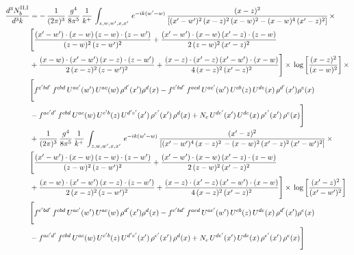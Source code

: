 \documentclass[9pt]{article}
\numberwithin{equation}{section}
\begin{document}
\begin{align}
    \frac{d^{3}N^{\rm II,I}_{b}}{d^{3}k}  & =  -\, \frac{1}{(2\pi)^{3}}\, \frac{g^{4}}{8\pi^{5}}\,\frac{1}{k^{+}}\,\int_{z,w,w^{\prime},x,x'}\, e^{-ik(w^{\prime}-w)}\, \frac{(x-z)^{2}}{\left[(x'-w')^{2}\,(x-z)^{2}\,(x-w)^{2} - (x-w)^{4}\, (x'-z)^{2}\right]}\,  \times\notag \\ & \Bigg[\frac{(x'-w')\cdot (x-w)\, (z-w)\cdot (z-w')}{(z-w)^{2}\, (z-w')^{2}}+\frac{(x'-w')\cdot (x-w)\, (x'-z)\cdot (z-w)}{2\, (z-w)^{2}\, (x'-z)^{2}}\notag \\ & +\frac{(x-w)\cdot (x'-w')\, (x-z)\cdot (z-w')}{2\, (x-z)^{2}\, (z-w')^{2}}+\frac{(x-z)\cdot (x'-z)\, (x'-w')\cdot (x-w)}{4\, (x-z)^{2}\, (x'-z)^{2}}\Bigg] \times\,\log{\left[\frac{(x-z)^{2}}{(x-w)^{2}}\right]}\,\times \notag \\ & \Bigg[f^{c'bd'}\,f^{cbd}\, U^{ac'}(w')\,U^{ac}(w)\,\rho^{d'}(x')\rho^{d}(x)- f^{c'bd'}\,f^{acd}\,U^{ac'}(w')\,U^{cb}(z)\,U^{de}(x)\,\rho^{d'}(x')\rho^{e}(x) \notag \\ & -f^{ac'd'}\,f^{cbd}\,U^{ac}(w)\,U^{c'b}(z)\,U^{d'e'}(x')\,\rho^{e'}(x')\,\rho^{d}(x) +N_{c}\,U^{de'}(x')\,U^{de}(x)\,\rho^{e'}(x')\,\rho^{e}(x)\Bigg] \notag \\
&  + \frac{1}{(2\pi)^{3}}\, \frac{g^{4}}{8\pi^{5}}\,\frac{1}{k^{+}}\,\int_{z,w,w^{\prime},x,x'}\, e^{-ik(w^{\prime}-w)}\, \frac{(x'-z)^{2}}{\left[(x'-w')^{4}\,(x-z)^{2}\, - (x-w)^{2}\, (x'-z)^{2}\,(x'-w')^{2}\right]}\,  \times\notag \\ & \Bigg[\frac{(x'-w')\cdot (x-w)\, (z-w)\cdot (z-w')}{(z-w)^{2}\, (z-w')^{2}}+\frac{(x'-w')\cdot (x-w)\, (x'-z)\cdot (z-w)}{2\, (z-w)^{2}\, (x'-z)^{2}}\notag \\ & +\frac{(x-w)\cdot (x'-w')\, (x-z)\cdot (z-w')}{2\, (x-z)^{2}\, (z-w')^{2}}+\frac{(x-z)\cdot (x'-z)\, (x'-w')\cdot (x-w)}{4\, (x-z)^{2}\, (x'-z)^{2}}\Bigg] \times\,\log{\left[\frac{(x'-z)^{2}}{(x'-w')^{2}}\right]} \notag \\ & \Bigg[f^{c'bd'}\,f^{cbd}\, U^{ac'}(w')\,U^{ac}(w)\,\rho^{d'}(x')\rho^{d}(x)- f^{c'bd'}\,f^{acd}\,U^{ac'}(w')\,U^{cb}(z)\,U^{de}(x)\,\rho^{d'}(x')\rho^{e}(x) \notag \\ & -f^{ac'd'}\,f^{cbd}\,U^{ac}(w)\,U^{c'b}(z)\,U^{d'e'}(x')\,\rho^{e'}(x')\,\rho^{d}(x) +N_{c}\,U^{de'}(x')\,U^{de}(x)\,\rho^{e'}(x')\,\rho^{e}(x)\Bigg]
\end{align}
\end{document}
